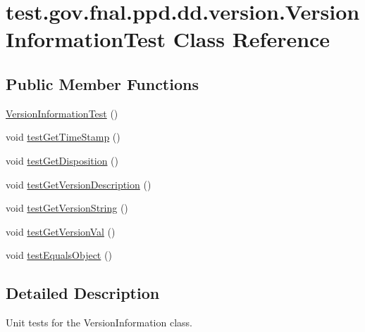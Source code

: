 \hypertarget{classtest_1_1gov_1_1fnal_1_1ppd_1_1dd_1_1version_1_1VersionInformationTest}{\section{test.\-gov.\-fnal.\-ppd.\-dd.\-version.\-Version\-Information\-Test Class Reference}
\label{classtest_1_1gov_1_1fnal_1_1ppd_1_1dd_1_1version_1_1VersionInformationTest}
}
\subsection*{Public Member Functions}
\begin{DoxyCompactItemize}
\item 
\hyperlink{classtest_1_1gov_1_1fnal_1_1ppd_1_1dd_1_1version_1_1VersionInformationTest_a3bf4db405095593ad8b5135ec8f37d57}{Version\-Information\-Test} ()
\item 
void \hyperlink{classtest_1_1gov_1_1fnal_1_1ppd_1_1dd_1_1version_1_1VersionInformationTest_a167760db94b1ae0e4a4544f9b30bef20}{test\-Get\-Time\-Stamp} ()
\item 
void \hyperlink{classtest_1_1gov_1_1fnal_1_1ppd_1_1dd_1_1version_1_1VersionInformationTest_affab9e6c1cb6f857d3a77c6d572da796}{test\-Get\-Disposition} ()
\item 
void \hyperlink{classtest_1_1gov_1_1fnal_1_1ppd_1_1dd_1_1version_1_1VersionInformationTest_a0f52d719513f2cad23f2e2a50b4c226d}{test\-Get\-Version\-Description} ()
\item 
void \hyperlink{classtest_1_1gov_1_1fnal_1_1ppd_1_1dd_1_1version_1_1VersionInformationTest_a8bede2f0306eae967806bfdf65a33d58}{test\-Get\-Version\-String} ()
\item 
void \hyperlink{classtest_1_1gov_1_1fnal_1_1ppd_1_1dd_1_1version_1_1VersionInformationTest_a0b082e06777beea76635855e0cdd5f1d}{test\-Get\-Version\-Val} ()
\item 
void \hyperlink{classtest_1_1gov_1_1fnal_1_1ppd_1_1dd_1_1version_1_1VersionInformationTest_a5d44ecd207c1620740ab7bf75d8e9f3a}{test\-Equals\-Object} ()
\end{DoxyCompactItemize}


\subsection{Detailed Description}
Unit tests for the Version\-Information class.

